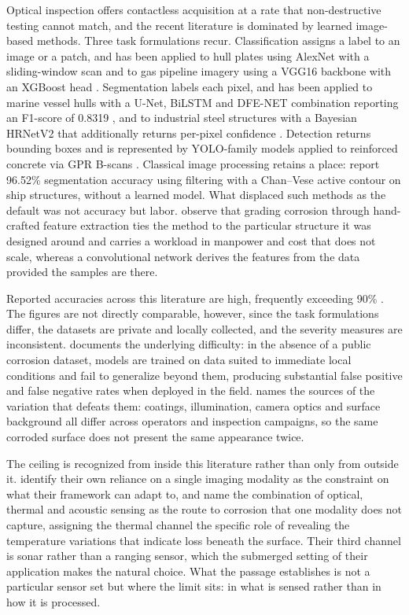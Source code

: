 Optical inspection offers contactless acquisition at a rate that non-destructive
testing cannot match, and the recent literature is dominated by learned
image-based methods. Three task formulations recur. Classification assigns a
label to an image or a patch, and has been applied to hull plates using AlexNet
with a sliding-window scan \citep{Yao2019} and to gas pipeline imagery using a VGG16
backbone with an XGBoost head \citep{Alvani2026}. Segmentation labels each pixel, and has
been applied to marine vessel hulls with a
U-Net, BiLSTM and DFE-NET combination reporting an F1-score of 0.8319 \citep{Yu2022},
and to industrial steel structures with a Bayesian HRNetV2 that additionally
returns per-pixel confidence \citep{Nash2022}. Detection returns bounding boxes and is
represented by YOLO-family models applied to reinforced concrete via GPR
B-scans \citep{Bui2026}. Classical image processing
retains a place: \citet{Imran2025} report 96.52\% segmentation accuracy using
filtering with a Chan--Vese active contour on ship structures, without a learned
model. What displaced such methods as the default was not accuracy but labor.
\citet{Yao2019} observe that grading corrosion through hand-crafted feature
extraction ties the method to the particular structure it was designed around
and carries a workload in manpower and cost that does not scale, whereas a
convolutional network derives the features from the data provided the samples
are there.

Reported accuracies across this literature are high, frequently exceeding 90\%
\citep{Alvani2026,Imran2025,Yao2019,Lavadiya2022}. The figures are not directly comparable, however, since the
task formulations differ, the datasets are private and locally collected, and
the severity measures are inconsistent. \citet{Nash2022} documents the
underlying difficulty: in the absence of a public corrosion dataset, models are
trained on data suited to immediate local conditions and fail to generalize
beyond them, producing substantial false positive and false negative rates when
deployed in the field. \citet{Alvani2026} names the sources of the variation
that defeats them: coatings, illumination, camera optics and surface background
all differ across operators and inspection campaigns, so the same corroded
surface does not present the same appearance twice.

The ceiling is recognized from inside this literature rather than only from
outside it. \citet{Imran2025} identify their own reliance on a single imaging
modality as the constraint on what their framework can adapt to, and name the
combination of optical, thermal and acoustic sensing as the route to corrosion
that one modality does not capture, assigning the thermal channel the specific
role of revealing the temperature variations that indicate loss beneath the
surface. Their third channel is sonar rather than a ranging sensor, which the
submerged setting of their application makes the natural choice. What the
passage establishes is not a particular sensor set but where the limit sits: in
what is sensed rather than in how it is processed.


